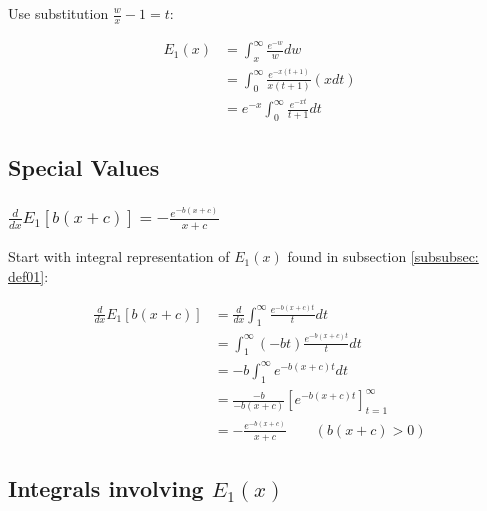 \documentclass[bibliography=totocnumbered]{scrartcl}
\begin{document}
	Use substitution $\frac{w}{x}-1=t$:
	
	\begin{align}
		E_1\left(x\right)&=\int_{x}^{\infty}\frac{e^{-w}}{w}dw\\
		&=\int_{0}^{\infty}\frac{e^{-x\left(t+1\right)}}{x\left(t+1\right)}\left(xdt\right)\\
		&=e^{-x}\int_{0}^{\infty}\frac{e^{-xt}}{t+1}dt
	\end{align}
	
	\subsection{Special Values}
	
	\subsubsection[A derivative of E1]{$\frac{d}{dx}E_1\left[b\left(x+c\right)\right]=-\frac{e^{-b\left(x+c\right)}}{x+c}$}
	\label{subsubsec: specval_deriv}
	
	Start with integral representation of $E_1\left(x\right)$ found in subsection \ref{subsubsec: def01}:
	
	\begin{align}
		\frac{d}{dx}E_1\left[b\left(x+c\right)\right]&=\frac{d}{dx}\int_{1}^{\infty}\frac{e^{-b\left(x+c\right)t}}{t}dt\\
		&=\int_{1}^{\infty}\left(-bt\right)\frac{e^{-b\left(x+c\right)t}}{t}dt\\
		&=-b\int_{1}^{\infty}e^{-b\left(x+c\right)t}dt\\
		&=\frac{-b}{-b\left(x+c\right)}\left[e^{-b\left(x+c\right)t}\right]^{\infty}_{t=1}\\
		&=-\frac{e^{-b\left(x+c\right)}}{x+c}\qquad\left(b\left(x+c\right)>0\right)
	\end{align}

	\subsection[Integrals involving E1(x)]{Integrals involving $E_1\left(x\right)$}
	
\end{document}
